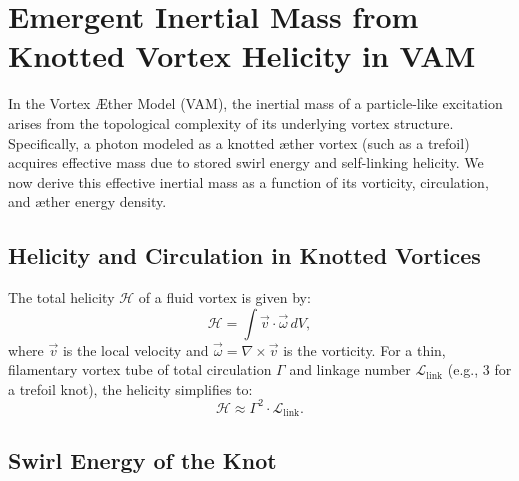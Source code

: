   \section{Emergent Inertial Mass from Knotted Vortex Helicity in VAM}

  In the Vortex \AE{}ther Model (VAM), the inertial mass of a particle-like excitation arises from the topological complexity of its underlying vortex structure. Specifically, a photon modeled as a knotted \ae{}ther vortex (such as a trefoil) acquires effective mass due to stored swirl energy and self-linking helicity. We now derive this effective inertial mass as a function of its vorticity, circulation, and \ae{}ther energy density.

  \subsection*{Helicity and Circulation in Knotted Vortices}

  The total helicity $\mathcal{H}$ of a fluid vortex is given by:
  \begin{equation}
    \mathcal{H} = \int \vec{v} \cdot \vec{\omega} \, dV,
  \end{equation}
  where $\vec{v}$ is the local velocity and $\vec{\omega} = \nabla \times \vec{v}$ is the vorticity. For a thin, filamentary vortex tube of total circulation $\Gamma$ and linkage number $\mathcal{L}_\text{link}$ (e.g., 3 for a trefoil knot), the helicity simplifies to:
  \begin{equation}
    \mathcal{H} \approx \Gamma^2 \cdot \mathcal{L}_\text{link}.
  \end{equation}

  \subsection{Swirl Energy of the Knot}

